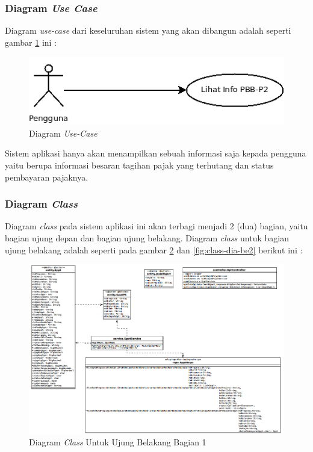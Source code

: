\documentclass[pdftex,12pt, oneside]{article}
\begin{document}
\subsubsection{Diagram \textit{Use Case}}

Diagram \textit{use-case} dari keseluruhan sistem yang akan dibangun adalah seperti gambar \ref{fig:use-case} ini :

\begin{figure}[H]	
	\centering
	\includegraphics[width=1\textwidth]{resources/use-case-diag}
	\caption{Diagram \textit{Use-Case}}
	\label{fig:use-case}
\end{figure}

Sistem aplikasi hanya akan menampilkan sebuah informasi saja kepada pengguna yaitu berupa informasi besaran tagihan pajak yang terhutang dan status pembayaran pajaknya.

\subsubsection{Diagram \textit{Class}}

Diagram \textit{class} pada sistem aplikasi ini akan terbagi menjadi 2 (dua) bagian, yaitu bagian ujung depan dan bagian ujung belakang. Diagram \textit{class} untuk bagian ujung belakang adalah seperti pada gambar \ref{fig:class-dia-be1} dan \ref{fig:class-dia-be2} berikut ini :

\begin{figure}[H]
	\centering
	\includegraphics[width=1\textwidth]{./resources/class-dia-be1}
	\caption{Diagram \textit{Class} Untuk Ujung Belakang Bagian 1}
	\label{fig:class-dia-be1}
\end{figure}
\end{document}
